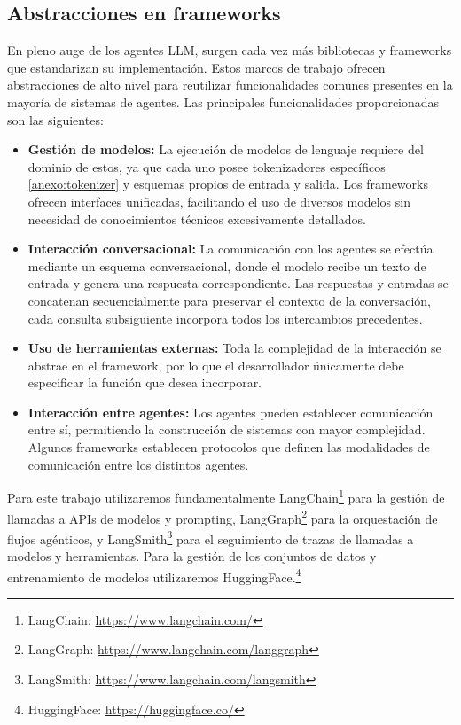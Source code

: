 


\subsection{Abstracciones en frameworks}
\label{sec:abst}
En pleno auge de los agentes LLM, surgen cada vez más bibliotecas y frameworks que estandarizan su implementación. Estos marcos de trabajo ofrecen abstracciones de alto nivel para reutilizar funcionalidades comunes presentes en la mayoría de sistemas de agentes.
Las principales funcionalidades proporcionadas son las siguientes: 
\begin{itemize}
\item {\textbf{Gestión de modelos:}} La ejecución de modelos de lenguaje requiere del dominio de estos, ya que cada uno posee tokenizadores específicos \ref{anexo:tokenizer} y esquemas propios de entrada y salida. Los frameworks ofrecen interfaces unificadas, facilitando el uso de diversos modelos sin necesidad de conocimientos técnicos excesivamente detallados.
\item {\textbf{Interacción conversacional:}} La comunicación con los agentes se efectúa mediante un esquema conversacional, donde el modelo recibe un texto de entrada y genera una respuesta correspondiente. Las respuestas y entradas se concatenan secuencialmente para preservar el contexto de la conversación, cada consulta subsiguiente incorpora todos los intercambios precedentes.
\item {\textbf{Uso de herramientas externas:}} Toda la complejidad de la interacción se abstrae en el framework, por lo que el desarrollador únicamente debe especificar la función que desea incorporar.
\item {\textbf{Interacción entre agentes:}} Los agentes pueden establecer comunicación entre sí, permitiendo la construcción de sistemas con mayor complejidad. Algunos frameworks establecen protocolos que definen las modalidades de comunicación entre los distintos agentes.
\end{itemize}

Para este trabajo utilizaremos fundamentalmente LangChain\footnote{LangChain: \url{https://www.langchain.com/}} para la gestión de llamadas a APIs de modelos y prompting, LangGraph\footnote{LangGraph: \url{https://www.langchain.com/langgraph}} para la orquestación de flujos agénticos, y LangSmith\footnote{LangSmith: \url{https://www.langchain.com/langsmith}} para el seguimiento de trazas de llamadas a modelos y herramientas. Para la gestión de los conjuntos de datos y entrenamiento de modelos utilizaremos HuggingFace.\footnote{HuggingFace: \url{https://huggingface.co/}} 

